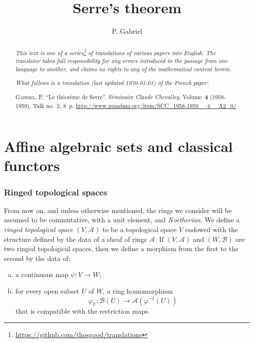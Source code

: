 \documentclass{article}
\theoremstyle{plain}
\theoremstyle{definition}
\newcommand{\sh}{\mathscr}
\newcommand{\oldpage}[1]{\marginpar{\footnotesize$\Big\vert$ \textit{p.~#1}}}
\begin{document}
\renewcommand{\abstractname}{Translator's note.}

\title{Serre's theorem}
\author{P. Gabriel}
\date{}
\maketitle

\begin{abstract}
  \renewcommand*{\thefootnote}{\fnsymbol{footnote}}
  \emph{This text is one of a series\footnote{\url{https://github.com/thosgood/translations}} of translations of various papers into English.}
  \emph{The translator takes full responsibility for any errors introduced in the passage from one language to another, and claims no rights to any of the mathematical content herein.}
  
  \emph{What follows is a translation (last updated \today) of the French paper:}

  \medskip\noindent
  \textsc{Gabriel, P.}
  ``Le th\'{e}or\`{e}me de Serre''.
  \emph{S\'{e}minaire Claude Chevalley}, Volume~\textbf{4} (1958-1959), Talk no.~2, 8~p.
  {\footnotesize\url{http://www.numdam.org/item/SCC_1958-1959__4__A2_0/}}
\end{abstract}

\setcounter{footnote}{0}

\tableofcontents



\bigskip\bigskip


\part{Affine algebraic sets and classical functors}
\label{chapterA}


\section{Ringed topological spaces}
\label{section1}

\oldpage{2-01}

From now on, and unless otherwise mentioned, the rings we consider will be assumed to be commutative, with a unit element, and \emph{Noetherian}.
We define a \emph{ringed topological space} $(V,\sh{A})$ to be a topological space $V$ endowed with the structure defined by the data of a sheaf of rings $\sh{A}$.
If $(V,\sh{A})$ and $(W,\sh{B})$ are two ringed topological spaces, then we define a morphism from the first to the second by the data of:
\begin{enumerate}[(a)]
  \item a continuous map $\psi\colon V\to W$;
  \item for every open subset $U$ of $W$, a ring homomorphism
    \[
      \varphi_U\colon\sh{B}(U)\to\sh{A}(\varphi^{-1}(U))
    \]
    that is compatible with the restriction maps.
\end{enumerate}
\end{document}
